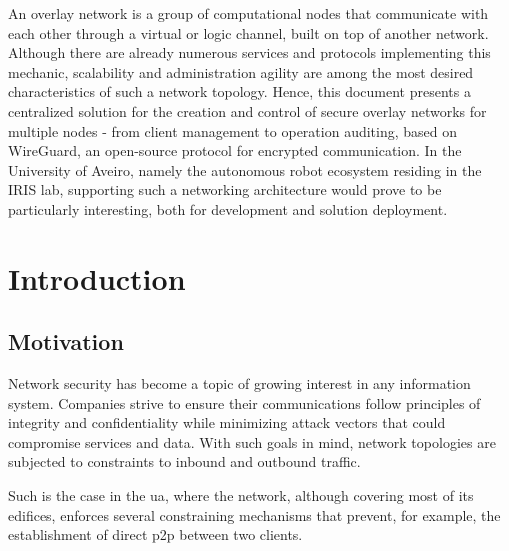 \documentclass[11pt,twoside,a4paper]{report}
\begin{document}
\TitlePage
  \vspace*{55mm}
       {An overlay network is a group of computational nodes that communicate with each other through a virtual or logic channel, built on top of another network. Although there are already numerous services and protocols implementing this mechanic, scalability and administration agility are among the most desired characteristics of such a network topology. Hence, this document presents a centralized solution for the creation and control of secure overlay networks for multiple nodes - from client management to operation auditing, based on WireGuard, an open-source protocol for encrypted communication. In the University of Aveiro, namely the autonomous robot ecosystem residing in the IRIS lab, supporting such a networking architecture would prove to be particularly interesting, both for development and solution deployment.}
\EndTitlePage
\titlepage\ \endtitlepage %


%
%
\tableofcontents

\cleardoublepage
\listoffigures

\cleardoublepage
\listoftables

\cleardoublepage


\cleardoublepage
{}
\chapter{Introduction}

\section{Motivation}

Network security has become a topic of growing interest in any information system. Companies strive to ensure their communications follow principles of integrity and confidentiality while minimizing attack vectors that could compromise services and data. With such goals in mind, network topologies are subjected to constraints to inbound and outbound traffic.

Such is the case in the \ac{ua}, where the network, although covering most of its edifices, enforces several constraining mechanisms that prevent, for example, the establishment of direct \ac{p2p} between two clients.
\end{document}
